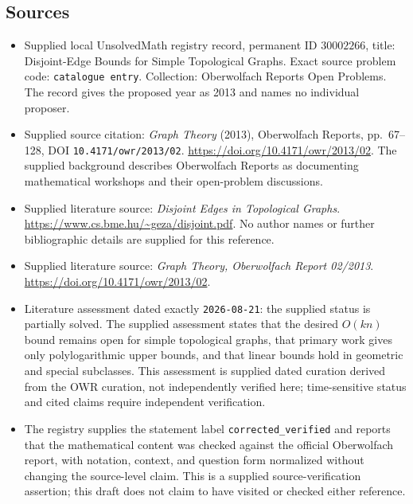 \documentclass[11pt]{article}
\begin{document}
\subsection{Sources}
\begin{itemize}
\item Supplied local UnsolvedMath registry record, permanent ID \(30002266\), title: Disjoint-Edge Bounds for Simple Topological Graphs. Exact source problem code: \texttt{catalogue entry}. Collection: Oberwolfach Reports Open Problems. The record gives the proposed year as 2013 and names no individual proposer.
\item Supplied source citation: \emph{Graph Theory} (2013), Oberwolfach Reports, pp.\ 67--128, DOI \texttt{10.4171/owr/2013/02}. \url{https://doi.org/10.4171/owr/2013/02}. The supplied background describes Oberwolfach Reports as documenting mathematical workshops and their open-problem discussions.
\item Supplied literature source: \emph{Disjoint Edges in Topological Graphs}. \url{https://www.cs.bme.hu/~geza/disjoint.pdf}. No author names or further bibliographic details are supplied for this reference.
\item Supplied literature source: \emph{Graph Theory, Oberwolfach Report 02/2013}. \url{https://doi.org/10.4171/owr/2013/02}.
\item Literature assessment dated exactly \texttt{2026-08-21}: the supplied status is partially solved. The supplied assessment states that the desired \(O(kn)\) bound remains open for simple topological graphs, that primary work gives only polylogarithmic upper bounds, and that linear bounds hold in geometric and special subclasses. This assessment is supplied dated curation derived from the OWR curation, not independently verified here; time-sensitive status and cited claims require independent verification.
\item The registry supplies the statement label \texttt{corrected\_verified} and reports that the mathematical content was checked against the official Oberwolfach report, with notation, context, and question form normalized without changing the source-level claim. This is a supplied source-verification assertion; this draft does not claim to have visited or checked either reference.
\end{itemize}
\end{document}
